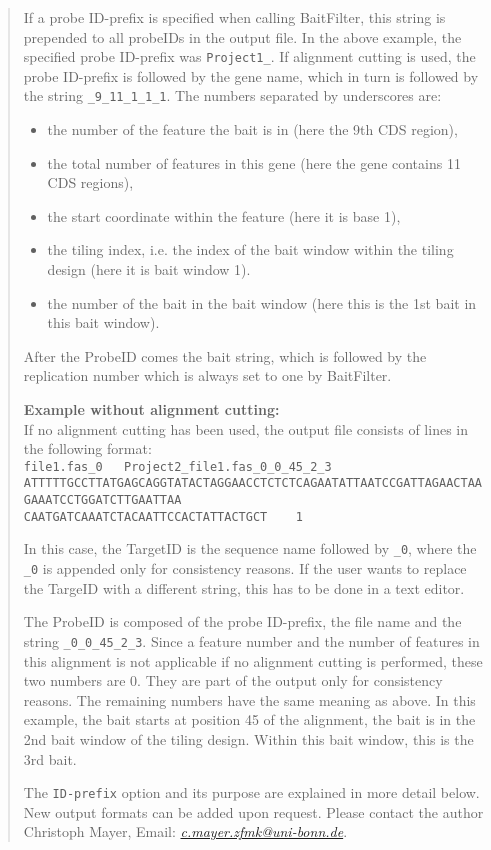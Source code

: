 \documentclass[a4paper,pdflatex,11pt]{article}
\begin{document}
\begin{quote}
If a probe ID-prefix is specified when calling BaitFilter, this string is prepended to all probeIDs in the
output file. In the above example, the specified probe ID-prefix was \verb+Project1_+.
If alignment cutting is used, the probe ID-prefix is followed by the gene name, which in turn is followed by the string 
\verb+_9_11_1_1_1+.
The numbers separated by underscores are:
\begin{itemize}
\item the number of the feature the bait is in (here the 9th CDS region),
\item the total number of features in this gene (here the gene contains 11 CDS regions),
\item the start coordinate within the feature (here it is base 1),
\item the tiling index, i.e. the index of the bait window within the tiling design (here it is bait window 1).
\item the number of the bait in the bait window (here this is the 1st bait in this bait window).
\end{itemize}

After the ProbeID comes the bait string, which is followed by the replication number which is always set to one
by BaitFilter.

{\bf Example without alignment cutting:}\\
If no alignment cutting has been used, the output file consists of lines in the following format:\\
{
\tiny
\verb+file1.fas_0	Project2_file1.fas_0_0_45_2_3	ATTTTTGCCTTATGAGCAGGTATACTAGGAACCTCTCTCAGAATATTAATCCGATTAGAACTAAGAAATCCTGGATCTTGAATTAA+\\[-1mm]
\verb+CAATGATCAAATCTACAATTCCACTATTACTGCT	1+\\
}

In this case, the TargetID is the sequence name followed by \verb+_0+, where the \verb+_0+ is appended only for consistency reasons.
If the user wants to replace the TargeID with a different string, this has to be done in a text editor.

The ProbeID is composed of the probe ID-prefix, the file name and the string \verb+_0_0_45_2_3+. Since a feature number and the number of features in this alignment
is not applicable if no alignment cutting is performed, these two numbers are 0. They are part of the output only for consistency reasons.
The remaining numbers have the same
meaning as above. In this example, the bait starts at position 45 of the alignment, the bait is in the 2nd bait window of the tiling design. Within this bait window,
this is the 3rd bait.

The \verb+ID-prefix+ option and its purpose are explained in more detail below.\\


New output formats can be added upon request. Please contact the
author Christoph Mayer, Email:
\href{mailto:c.mayer.zfmk@uni-bonn.de}{\emph{c.mayer.zfmk@uni-bonn.de}}.
\end{quote}
\end{document}
